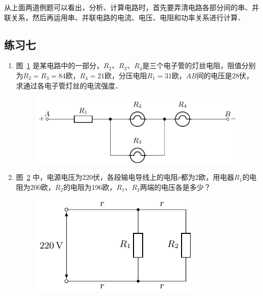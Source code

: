 从上面两道例题可以看出，分析、计算电路时，首先要弄清电路各部分间的串、并联关系，然后再运用串、并联电路的电流、电压、电阻和功率关系进行计算．


\subsection*{练习七}
\begin{enumerate}
    \item 图~\ref{fig_B_7-21} 是某电路中的一部分，$R_2$、$R_3$、$R_4$是三个电子管的灯丝电阻，阻值分别为$R_2=R_3=84$欧，$R_4=21$欧，分压电阻$R_1=31$欧，$AB$间的电压是28伏，求通过各电子管灯丝的电流强度．
    \begin{figure}[htbp]
        \centering
        \includegraphics{fig/B/7-21.pdf}
        \caption{}\label{fig_B_7-21}
    \end{figure}

    \item 图~\ref{fig_B_7-22} 中，电源电压为220伏，各段输电导线上的电阻$r$都为2欧，用电器$R_1$的电阻为200欧，$R_2$的电阻为196欧，$R_1$、$R_2$两端的电压各是多少？
    \begin{figure}[htbp]
        \centering
        \includegraphics{fig/B/7-22.pdf}
        \caption{}\label{fig_B_7-22}
    \end{figure}


\end{enumerate}

